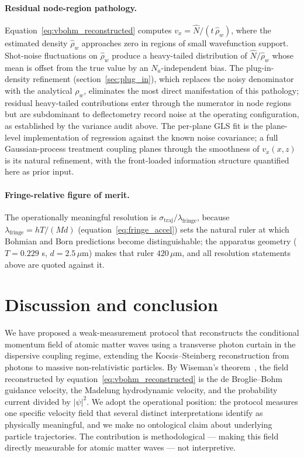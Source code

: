 \documentclass[11pt,a4paper]{article}
\begin{document}
\paragraph{Residual node-region pathology.} Equation~\eqref{eq:vbohm_reconstructed} computes $v_x = \widehat{N}/(t\,\widehat\rho_w)$, where the estimated density $\widehat\rho_w$ approaches zero in regions of small wavefunction support. Shot-noise fluctuations on $\widehat\rho_w$ produce a heavy-tailed distribution of $\widehat{N}/\widehat\rho_w$ whose mean is offset from the true value by an $N_a$-independent bias. The plug-in-density refinement (section~\ref{sec:plug_in}), which replaces the noisy denominator with the analytical $\rho_w$, eliminates the most direct manifestation of this pathology; residual heavy-tailed contributions enter through the numerator in node regions but are subdominant to deflectometry record noise at the operating configuration, as established by the variance audit above. The per-plane GLS fit is the plane-level implementation of regression against the known noise covariance; a full Gaussian-process treatment coupling planes through the smoothness of $v_x(x, z)$ is its natural refinement, with the front-loaded information structure quantified here as prior input.

\paragraph{Fringe-relative figure of merit.} The operationally meaningful resolution is $\sigma_\text{traj}/\lambda_\text{fringe}$, because $\lambda_\text{fringe} = hT/(Md)$ (equation~\eqref{eq:fringe_accel}) sets the natural ruler at which Bohmian and Born predictions become distinguishable; the apparatus geometry ($T = 0.229$ s, $d = 2.5\,\mu$m) makes that ruler $420\,\mu$m, and all resolution statements above are quoted against it.

\section{Discussion and conclusion}
\label{sec:discussion}

We have proposed a weak-measurement protocol that reconstructs the conditional momentum field of atomic matter waves using a transverse photon curtain in the dispersive coupling regime, extending the Kocsis--Steinberg reconstruction from photons to massive non-relativistic particles. By Wiseman's theorem~\cite{Wiseman2007}, the field reconstructed by equation~\eqref{eq:vbohm_reconstructed} is the de Broglie--Bohm guidance velocity, the Madelung hydrodynamic velocity, and the probability current divided by $|\psi|^2$. We adopt the operational position: the protocol measures one specific velocity field that several distinct interpretations identify as physically meaningful, and we make no ontological claim about underlying particle trajectories. The contribution is methodological --- making this field directly measurable for atomic matter waves --- not interpretive.
\end{document}
